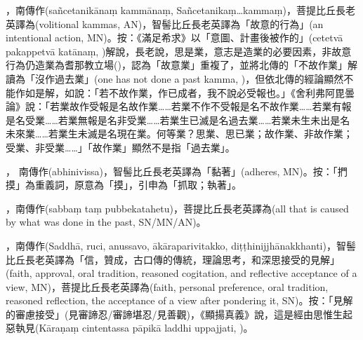 \startitemgroup[noteitems]
\item{}，南傳作(sañcetanikānaṃ kammānaṃ, Sañcetanikaṃ…kammaṃ)，菩提比丘長老英譯為(volitional kammas, AN)，智髻比丘長老英譯為「故意的行為」(an intentional action, MN)。按：《滿足希求》以「意圖、計畫後被作的」(cetetvā pakappetvā katānaṃ, )解說，長老說，思是業，意志是造業的必要因素，非故意行為仍造業為耆那教立場()，認為「故意業」重複了，並將北傳的「不故作業」解讀為「沒作過去業」(one has not done a past kamma, )，但依北傳的經論顯然不能作如是解，如說：「若不故作業，作已成者，我不說必受報也。」《舍利弗阿毘曇論》說：「若業故作受報是名故作業……若業不作不受報是名不故作業……若業有報是名受業……若業無報是名非受業……若業生已滅是名過去業……若業未生未出是名未來業……若業生未滅是名現在業。何等業？思業、思已業；故作業、非故作業；受業、非受業……」「故作業」顯然不是指「過去業」。
\stopitemgroup

\startitemgroup[noteitems]
\item{}， 南傳作(abhinivissa)，智髻比丘長老英譯為「黏著」(adheres, MN)。按：「捫摸」為重義詞，原意為「摸」，引申為「抓取；執著」。
\stopitemgroup

\startitemgroup[noteitems]
\item{}，南傳作(sabbaṃ taṃ pubbekatahetu)，菩提比丘長老英譯為(all that is caused by what was done in the past, SN/MN/AN)。
\stopitemgroup

\startitemgroup[noteitems]
\item{}，南傳作(Saddhā, ruci, anussavo, ākāraparivitakko, diṭṭhinijjhānakkhanti)，智髻比丘長老英譯為「信，贊成，古口傳的傳統，理論思考，和深思接受的見解」(faith, approval, oral tradition, reasoned cogitation, and reflective acceptance of a view, MN)，菩提比丘長老英譯為(faith, personal preference, oral tradition, reasoned reflection, the acceptance of a view after pondering it, SN)。按：「見解的審慮接受」(見審諦忍/審諦堪忍/見善觀)，《顯揚真義》說，這是經由思惟生起惡執見(Kāraṇaṃ cintentassa pāpikā laddhi uppajjati, )。
\stopitemgroup

